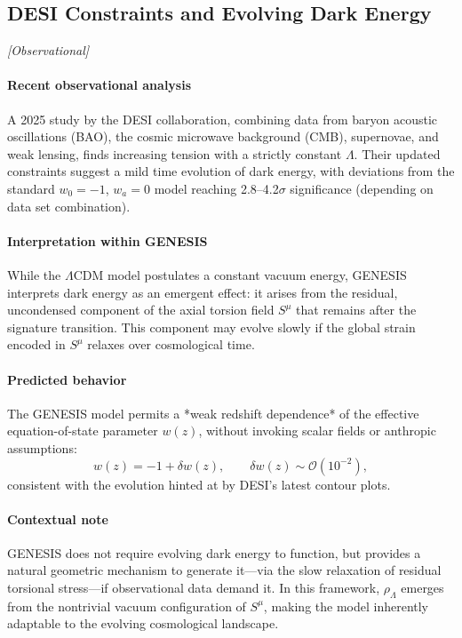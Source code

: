 \documentclass{article}
\newcommand{\obstag}{\textcolor{green!60!black}{\textit{[Observational]}}}
\begin{document}
\subsection{DESI Constraints and Evolving Dark Energy}
\label{sec:DESI-DE}
\obstag

\paragraph{Recent observational analysis}
A 2025 study by the DESI collaboration, combining data from baryon acoustic oscillations (BAO), the cosmic microwave background (CMB), supernovae, and weak lensing, finds increasing tension with a strictly constant $\Lambda$. Their updated constraints suggest a mild time evolution of dark energy, with deviations from the standard $w_0 = -1$, $w_a = 0$ model reaching 2.8–4.2$\sigma$ significance (depending on data set combination).

\paragraph{Interpretation within GENESIS}
While the $\Lambda$CDM model postulates a constant vacuum energy, GENESIS interprets dark energy as an emergent effect: it arises from the residual, uncondensed component of the axial torsion field $S^\mu$ that remains after the signature transition. This component may evolve slowly if the global strain encoded in $S^\mu$ relaxes over cosmological time.

\paragraph{Predicted behavior}
The GENESIS model permits a *weak redshift dependence* of the effective equation-of-state parameter $w(z)$, without invoking scalar fields or anthropic assumptions:
\begin{equation}
  w(z) = -1 + \delta w(z),
  \qquad
  \delta w(z) \sim \mathcal{O}(10^{-2}),
\end{equation}
consistent with the evolution hinted at by DESI's latest contour plots.

\paragraph{Contextual note}
GENESIS does not require evolving dark energy to function, but provides a natural geometric mechanism to generate it—via the slow relaxation of residual torsional stress—if observational data demand it. In this framework, $\rho_\Lambda$ emerges from the nontrivial vacuum configuration of $S^\mu$, making the model inherently adaptable to the evolving cosmological landscape.
\end{document}

